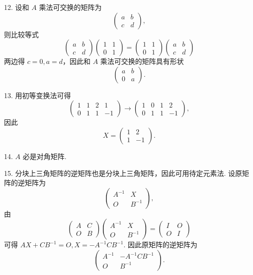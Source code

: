 \documentclass[UTF8, 12pt, fontset=fandol, oneside]{ctexart}
\begin{document}
12. 设和 $A$ 乘法可交换的矩阵为
\[
\left(
\begin{array}{cc}
a & b\\
c & d
\end{array}
\right),
\]
则比较等式
\[
\left(
\begin{array}{cc}
a & b\\
c & d
\end{array}
\right)
\left(
\begin{array}{cc}
1 & 1\\
0 & 1
\end{array}
\right)
=
\left(
\begin{array}{cc}
1 & 1\\
0 & 1
\end{array}
\right)
\left(
\begin{array}{cc}
a & b\\
c & d
\end{array}
\right)
\]
两边得 $c=0,a=d$，因此和 $A$ 乘法可交换的矩阵具有形状
\[
\left(
\begin{array}{cc}
a & b\\
0 & a
\end{array}
\right).
\]

13. 用初等变换法可得
\[
\left(
\begin{array}{cc|rr}
1 & 1 & 2 & 1\\
0 & 1 & 1 & -1
\end{array}
\right)
\to
\left(
\begin{array}{cc|rr}
1 & 0 & 1 & 2\\
0 & 1 & 1 & -1
\end{array}
\right),
\]
因此
\[
X=
\left(
\begin{array}{rr}
1 & 2\\
1 & -1
\end{array}
\right).
\]

14. $A$ 必是对角矩阵.

15. 分块上三角矩阵的逆矩阵也是分块上三角矩阵，因此可用待定元素法. 设原矩阵的逆矩阵为
\[
\left(
\begin{array}{cc}
A^{-1} & X\\
O & B^{-1}
\end{array}
\right),
\]
由
\[
\left(
\begin{array}{cc}
A & C\\
O & B
\end{array}
\right)
\left(
\begin{array}{cc}
A^{-1} & X\\
O & B^{-1}
\end{array}
\right)
=
\left(
\begin{array}{cc}
I & O\\
O & I
\end{array}
\right)
\]
可得 $AX+CB^{-1}=O, X=-A^{-1}CB^{-1}$. 因此原矩阵的逆矩阵为
\[
\left(
\begin{array}{cc}
A^{-1} & -A^{-1}CB^{-1}\\
O & B^{-1}
\end{array}
\right).
\]
\end{document}
